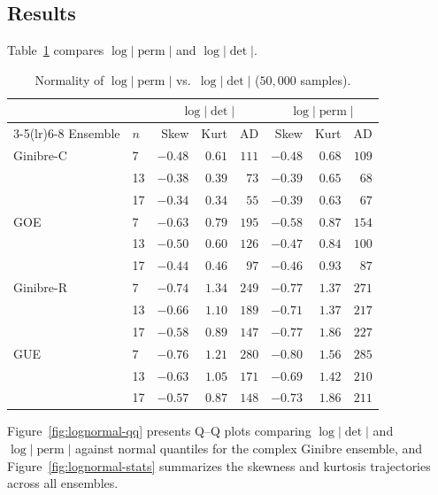 \documentclass[11pt]{amsart}
\theoremstyle{definition}
\theoremstyle{remark}
\DeclareMathOperator{\perm}{perm}
\begin{document}
\subsection{Results}

Table~\ref{tab:lognormal} compares $\log|\perm|$ and $\log|\det|$.

\begin{table}[ht]
\centering
\caption{Normality of $\log|\perm|$ vs.\ $\log|\det|$ ($50{,}000$
samples).}\label{tab:lognormal}
\medskip
\begin{tabular}{llrrrrrr}
\toprule
& & \multicolumn{3}{c}{$\log|\det|$} & \multicolumn{3}{c}{$\log|\perm|$} \\
\cmidrule(lr){3-5}\cmidrule(lr){6-8}
Ensemble & $n$ & Skew & Kurt & AD & Skew & Kurt & AD \\
\midrule
Ginibre-C & 7  & $-0.48$ & $0.61$ & $111$ & $-0.48$ & $0.68$ & $109$ \\
          & 13 & $-0.38$ & $0.39$ & $73$  & $-0.39$ & $0.65$ & $68$ \\
          & 17 & $-0.34$ & $0.34$ & $55$  & $-0.39$ & $0.63$ & $67$ \\
\midrule
GOE       & 7  & $-0.63$ & $0.79$ & $195$ & $-0.58$ & $0.87$ & $154$ \\
          & 13 & $-0.50$ & $0.60$ & $126$ & $-0.47$ & $0.84$ & $100$ \\
          & 17 & $-0.44$ & $0.46$ & $97$  & $-0.46$ & $0.93$ & $87$ \\
\midrule
Ginibre-R & 7  & $-0.74$ & $1.34$ & $249$ & $-0.77$ & $1.37$ & $271$ \\
          & 13 & $-0.66$ & $1.10$ & $189$ & $-0.71$ & $1.37$ & $217$ \\
          & 17 & $-0.58$ & $0.89$ & $147$ & $-0.77$ & $1.86$ & $227$ \\
\midrule
GUE       & 7  & $-0.76$ & $1.21$ & $280$ & $-0.80$ & $1.56$ & $285$ \\
          & 13 & $-0.63$ & $1.05$ & $171$ & $-0.69$ & $1.42$ & $210$ \\
          & 17 & $-0.57$ & $0.87$ & $148$ & $-0.73$ & $1.86$ & $211$ \\
\bottomrule
\end{tabular}
\end{table}

Figure~\ref{fig:lognormal-qq} presents Q--Q plots comparing
$\log|\det|$ and $\log|\perm|$ against normal quantiles for the
complex Ginibre ensemble, and Figure~\ref{fig:lognormal-stats}
summarizes the skewness and kurtosis trajectories across all ensembles.
\end{document}
